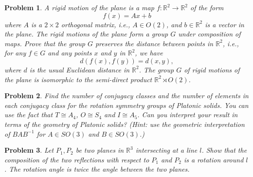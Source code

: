 \documentclass{article}
\newtheorem{ex}{Problem}
\newcommand{\R}{\mathbb{R}}
\begin{document}
\begin{ex}
    A rigid motion of the plane is a map $f\colon \R^2\to \R^2$ of the form
    \[f(x) = Ax+b\]
    where $A$ is a $2\times 2$ orthogonal matrix, i.e., $A\in O(2)$, and $b\in \R^2$ is a vector in the plane. 
    The rigid motions of the plane form a group $G$ under composition
    of maps. Prove that the group $G$ preserves the distance between points in $\R^2$,
    i.e., for any $f\in G$ and any points $x$ and $y$ in $\R^2$,
    we have
    \[d(f(x), f(y)) = d(x, y),\]
    where $d$ is the usual Euclidean distance in $\R^2$.
The group $G$ of rigid motions of the plane is isomorphic to the semi-direct product $\R^2 \rtimes O(2)$.
\end{ex}

\begin{ex}
Find the number of conjugacy classes and the number of elements in each conjugacy class for the rotation symmetry groups of Platonic solids. You can use the fact that $T\cong A_4$, $O\cong S_4$ and $I\cong A_5$. Can you interpret your result in terms of the geometry of Platonic solids? (Hint: use the geometric interpretation of $BAB^{-1}$ for $A\in SO(3)$ and $B\in SO(3)$.)
\end{ex}

\begin{ex}
  Let $P_1, P_2$ be two planes in $\R^3$ intersecting at a line $l$. Show that the composition of the two reflections with respect to $P_1$ and $P_2$ is a rotation around $l$. The rotation angle is twice the angle between the two planes.
\end{ex}
\end{document}
